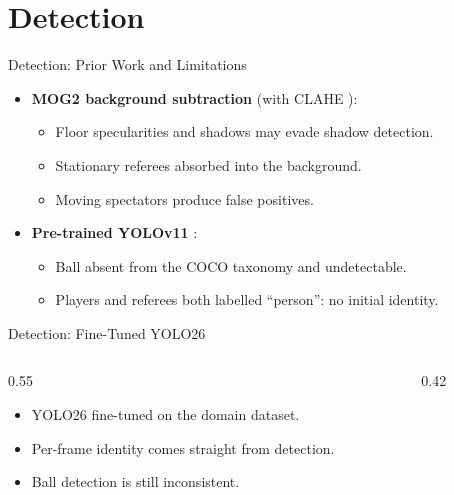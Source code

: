 \section{Detection}
\label{sec:detection}
\begin{frame}{Detection: Prior Work and Limitations}
\begin{itemize}
  \item \textbf{MOG2 background subtraction} \cite{survey} (with CLAHE \cite{clahe}):
  \begin{itemize}
    \item Floor specularities and shadows may evade shadow detection.
    \item Stationary referees absorbed into the background.
    \item Moving spectators produce false positives.
  \end{itemize}
  \item \textbf{Pre-trained YOLOv11} \cite{yolo_paper}:
  \begin{itemize}
    \item Ball absent from the COCO taxonomy and undetectable.
    \item Players and referees both labelled ``person'': no initial identity.
  \end{itemize}
\end{itemize}
\end{frame}

\begin{frame}{Detection: Fine-Tuned YOLO26}
\begin{columns}[T]
  \begin{column}{0.55\textwidth}
    \begin{itemize}
      \item YOLO26 fine-tuned on the domain dataset.
      \item Per-frame identity comes straight from detection.
      \item Ball detection is still inconsistent.
    \end{itemize}
  \end{column}
  \begin{column}{0.42\textwidth}
    \videobox
  \end{column}
\end{columns}
\end{frame}

